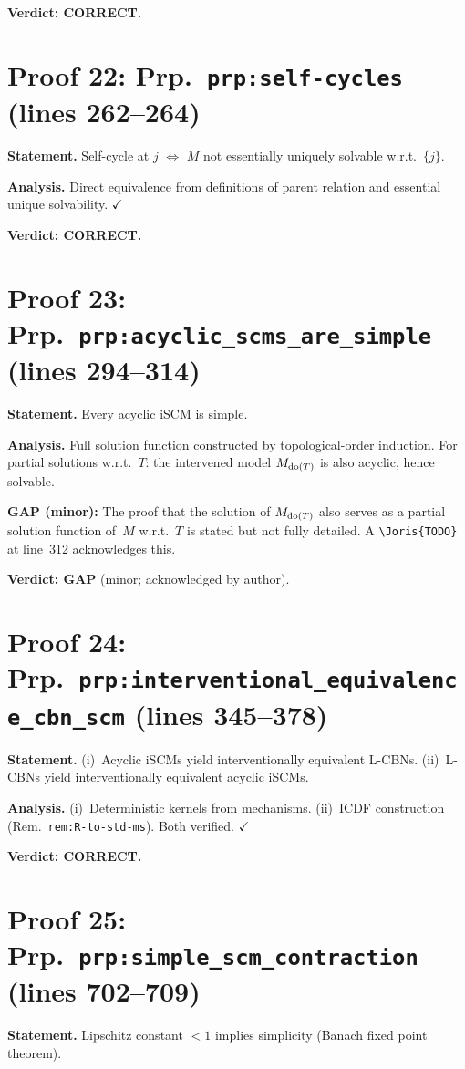 \documentclass{article}
\begin{document}
\textbf{Verdict: CORRECT.}

\section{Proof 22: Prp.\ \texttt{prp:self-cycles} (lines 262--264)}
\textbf{Statement.} Self-cycle at $j$ $\iff$ $M$ not essentially uniquely
solvable w.r.t.\ $\{j\}$.

\textbf{Analysis.} Direct equivalence from definitions of parent relation and
essential unique solvability.  $\checkmark$

\textbf{Verdict: CORRECT.}

\section{Proof 23: Prp.\ \texttt{prp:acyclic\_scms\_are\_simple} (lines 294--314)}
\textbf{Statement.} Every acyclic iSCM is simple.

\textbf{Analysis.} Full solution function constructed by topological-order
induction.  For partial solutions w.r.t.\ $T$: the intervened model
$M_{\operatorname{do}(T)}$ is also acyclic, hence solvable.

\textbf{GAP (minor):} The proof that the solution of $M_{\operatorname{do}(T)}$ also serves
as a partial solution function of~$M$ w.r.t.~$T$ is stated but not fully
detailed.  A \verb|\Joris{TODO}| at line~312 acknowledges this.

\textbf{Verdict: GAP} (minor; acknowledged by author).

\section{Proof 24: Prp.\ \texttt{prp:interventional\_equivalence\_cbn\_scm}
(lines 345--378)}
\textbf{Statement.} (i)~Acyclic iSCMs yield interventionally equivalent L-CBNs.
(ii)~L-CBNs yield interventionally equivalent acyclic iSCMs.

\textbf{Analysis.} (i)~Deterministic kernels from mechanisms.
(ii)~ICDF construction (Rem.~\texttt{rem:R-to-std-ms}).
Both verified.  $\checkmark$

\textbf{Verdict: CORRECT.}

\section{Proof 25: Prp.\ \texttt{prp:simple\_scm\_contraction} (lines 702--709)}
\textbf{Statement.} Lipschitz constant $<1$ implies simplicity (Banach fixed
point theorem).
\end{document}

